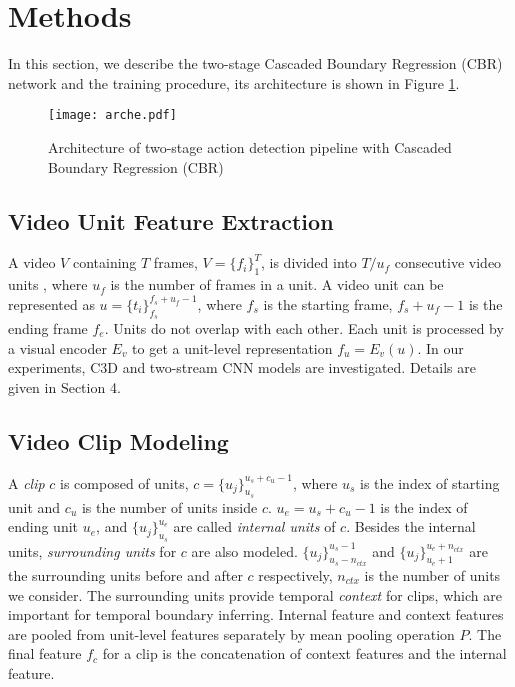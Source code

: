 \documentclass{bmvc2k}
\begin{document}
\section{Methods}
In this section, we describe the two-stage Cascaded Boundary Regression (CBR) network and the training procedure, its architecture is shown in Figure \ref{pipeline}.

\begin{figure*}[]
\centering
\texttt{[image: arche.pdf]}
\caption{ Architecture of two-stage action detection pipeline with Cascaded Boundary Regression (CBR)}
\label{pipeline}
\end{figure*}

\subsection{Video Unit Feature Extraction} \label{sec:unit processing}
A video $V$ containing $T$ frames, $V=\{f_i\}_1^T$, is divided into $T/u_f$ consecutive video units , where $u_f$ is the number of frames in a unit. A video unit can be represented as $u=\{t_i\}_{f_s}^{f_s+u_f-1}$, where $f_s$ is the starting frame, $f_s+u_f-1$ is the ending frame $f_e$. Units do not overlap with each other. Each unit is processed by a visual encoder $E_v$ to get a unit-level representation $f_u=E_v(u)$. In our experiments, C3D \cite{tran2015learning} and two-stream CNN models \cite{simonyan2014two} are investigated. Details are given in Section 4. 

\subsection{Video Clip Modeling}
A \emph{clip} $c$ is composed of units, $c=\{u_j\}_{u_s}^{u_s+c_u-1}$, where $u_s$ is the index of starting unit and $c_u$ is the number of units inside $c$. $u_e=u_s+c_u-1$ is the index of ending unit $u_e$, and $\{u_j\}_{u_s}^{u_e}$ are called \emph{internal units} of $c$. Besides the internal units, \emph{surrounding units} for $c$ are also modeled. $\{u_j\}_{u_s-n_{ctx}}^{u_s-1}$ and  $\{u_j\}_{u_e+1}^{u_e+n_{ctx}}$ are the surrounding units before and after $c$ respectively, $n_{ctx}$ is the number of units we consider. The surrounding units provide temporal \emph{context} for clips, which are important for temporal boundary inferring. Internal feature and context features are pooled from unit-level features separately by mean pooling operation $P$. The final feature $f_c$ for a clip is the concatenation of context features and the internal feature.
\end{document}
